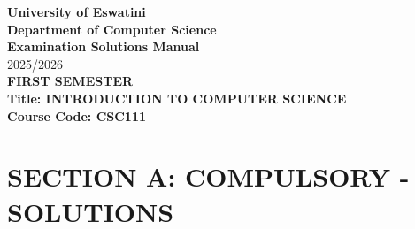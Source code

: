 \documentclass[12pt]{article}
\begin{document}
\begin{center}
    \textbf{University of Eswatini} \\
    \textbf{Department of Computer Science} \\
    \textbf{Examination Solutions Manual} \\
    2025/2026 \\
    \textbf{FIRST SEMESTER} \\
    \vspace{1cm}
    \textbf{Title: INTRODUCTION TO COMPUTER SCIENCE} \\
    \textbf{Course Code: CSC111} \\
\end{center}

\section*{SECTION A: COMPULSORY - SOLUTIONS}
\end{document}
